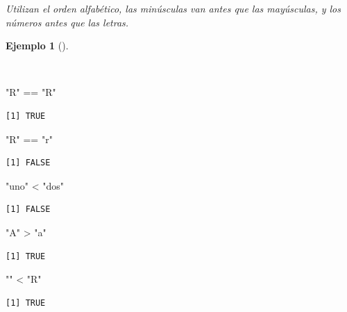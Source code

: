 \documentclass[
  a4paper,
]{scrreport}
\newenvironment{Shaded}{\begin{snugshade}}{\end{snugshade}}
\newcommand{\SpecialCharTok}[1]{\textcolor[rgb]{0.37,0.37,0.37}{#1}}
\newcommand{\StringTok}[1]{\textcolor[rgb]{0.13,0.47,0.30}{#1}}
\theoremstyle{definition}
\theoremstyle{definition}
\newtheorem{example}{Ejemplo}[chapter]
\theoremstyle{remark}
\begin{document}
\emph{Utilizan el orden alfabético, las minúsculas van antes que las
mayúsculas, y los números antes que las letras.}

\begin{example}[]\protect\hypertarget{exm-operaciones-comparacion-cadenas}{}\label{exm-operaciones-comparacion-cadenas}

~

\begin{Shaded}
\begin{Highlighting}[]
\StringTok{"R"} \SpecialCharTok{==} \StringTok{"R"}
\end{Highlighting}
\end{Shaded}

\begin{verbatim}
[1] TRUE
\end{verbatim}

\begin{Shaded}
\begin{Highlighting}[]
\StringTok{"R"} \SpecialCharTok{==} \StringTok{"r"}
\end{Highlighting}
\end{Shaded}

\begin{verbatim}
[1] FALSE
\end{verbatim}

\begin{Shaded}
\begin{Highlighting}[]
\StringTok{"uno"} \SpecialCharTok{\textless{}} \StringTok{"dos"}
\end{Highlighting}
\end{Shaded}

\begin{verbatim}
[1] FALSE
\end{verbatim}

\begin{Shaded}
\begin{Highlighting}[]
\StringTok{"A"} \SpecialCharTok{\textgreater{}} \StringTok{"a"}
\end{Highlighting}
\end{Shaded}

\begin{verbatim}
[1] TRUE
\end{verbatim}

\begin{Shaded}
\begin{Highlighting}[]
\StringTok{""} \SpecialCharTok{\textless{}} \StringTok{"R"}
\end{Highlighting}
\end{Shaded}

\begin{verbatim}
[1] TRUE
\end{verbatim}

\end{example}
\end{document}
